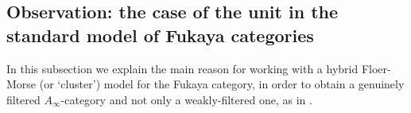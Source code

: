 	
	
	\subsection{Observation: the case of the unit in the standard model of Fukaya categories}\label{addend} In this subsection we explain the main reason for working with a hybrid Floer-Morse (or `cluster') model for the Fukaya category, in order to obtain a genuinely filtered $A_\infty$-category and not only a weakly-filtered one, as in \cite{Bi-Co-Sh:LagrSh}.
	
